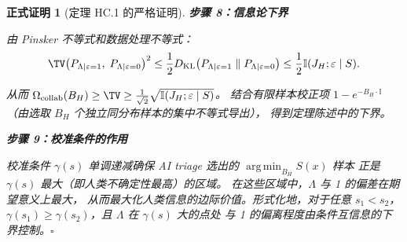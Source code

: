 \documentclass[12pt,a4paper]{article}
\newtheorem{formalproof}[theorem]{正式证明}
\newcommand{\I}{\mathbb{I}}
\newcommand{\argmin}{\operatorname*{arg\,min}}
\newcommand{\KL}{D_{\mathrm{KL}}}
\begin{document}
\begin{formalproof}[定理 HC.1 的严格证明]
\textbf{步骤 8：信息论下界}

由 Pinsker 不等式和数据处理不等式：
\begin{equation}
    \TV\big( P_{\Lambda \mid \varepsilon=1},\; P_{\Lambda \mid \varepsilon=0} \big)^2
    \leq \frac{1}{2} \KL\big( P_{\Lambda \mid \varepsilon=1} \;\|\; P_{\Lambda \mid \varepsilon=0} \big)
    \leq \frac{1}{2} \I(J_H; \varepsilon \mid S).
\end{equation}

从而 $\Omega_{\mathrm{collab}}(B_H) \geq \TV \geq \frac{1}{\sqrt{2}} \sqrt{\I(J_H; \varepsilon \mid S)}$。
结合有限样本校正项 $1 - e^{-B_H \cdot \I}$（由选取 $B_H$ 个独立同分布样本的集中不等式导出），
得到定理陈述中的下界。

\textbf{步骤 9：校准条件的作用}

校准条件 $\gamma(s)$ 单调递减确保 AI triage 选出的 $\argmin_{B_H} S(x)$ 样本
正是 $\gamma(s)$ 最大（即人类不确定性最高）的区域。
在这些区域中，$\Lambda$ 与 1 的偏差在期望意义上最大，
从而最大化人类信息的边际价值。形式化地，对于任意 $s_1 < s_2$，
$\gamma(s_1) \geq \gamma(s_2)$，且 $\Lambda$ 在 $\gamma(s)$ 大的点处
与 1 的偏离程度由条件互信息的下界控制。$\square$

\end{formalproof}
\end{document}
